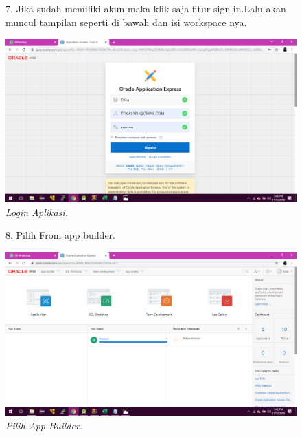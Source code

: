 \begin{enumerate}
\begin{figure}
\item[7.]Jika sudah memiliki akun maka klik saja fitur sign in.Lalu akan muncul tampilan seperti di bawah dan isi workspace nya.
    \begin{center}
    \includegraphics[scale=0.3]{figures/2.png}
    \caption{\textit{Login Aplikasi.}}
    \end{center}
    \label{gambar}
    \end{figure}

\begin{figure}
\item[8.]Pilih From app builder.
    \begin{center}
    \includegraphics[scale=0.3]{figures/3.png}
    \caption{\textit{Pilih App Builder.}}
    \end{center}
    \label{gambar}
    \end{figure}
    

\end{enumerate}
